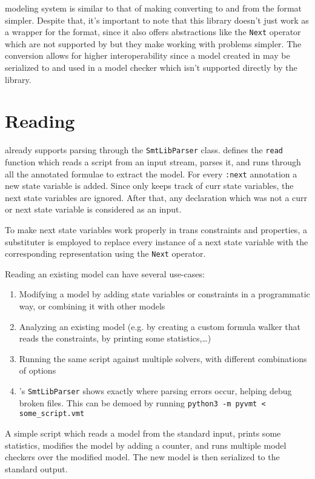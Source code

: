 \pyvmt{} modeling system is similar to that of \vmtlib{} making converting to and from the format simpler.
Despite that, it's important to note that this library doesn't just work as a wrapper for the format, since it also offers abstractions like the \texttt{Next} operator which are not supported by \vmtlib{} but they make working with \vmt{} problems simpler.
The conversion allows for higher interoperability since a model created in \pyvmt{} may be serialized to \vmtlib{} and used in a model checker which isn't supported directly by the library.

\section{Reading}
\pysmt{} already supports parsing \smtlib{} through the \texttt{SmtLibParser} class.
\pyvmt{} defines the \texttt{read} function which reads a script from an input stream, parses it, and runs through all the annotated formulae to extract the model.
For every \texttt{:next} annotation a new state variable is added. Since \pyvmt{} only keeps track of curr state variables, the next state variables are ignored.
After that, any declaration which was not a curr or next state variable is considered as an input.

To make next state variables work properly in trans constraints and properties, a substituter is employed to replace every instance of a next state variable with the corresponding representation using the \texttt{Next} operator.

Reading an existing \vmtlib{} model can have several use-cases:
\begin{enumerate}
    \item Modifying a model by adding state variables or constraints in a programmatic way, or combining it with other models
    \item Analyzing an existing model (e.g. by creating a custom formula walker that reads the constraints, by printing some statistics,\dots)
    \item Running the same \vmtlib{} script against multiple solvers, with different combinations of options
    \item \pysmt{}'s \texttt{SmtLibParser} shows exactly where parsing errors occur, helping debug broken \vmtlib{} files. This can be demoed by running \texttt{python3 -m pyvmt < some_script.vmt}
\end{enumerate}

\begin{listing}
    \label{alg:reading-vmtlib}
    \caption{A simple script which reads a \vmtlib{} model from the standard input, prints some statistics, modifies the model by adding a counter, and runs multiple model checkers over the modified model. The new model is then serialized to the standard output.}
\end{listing}

